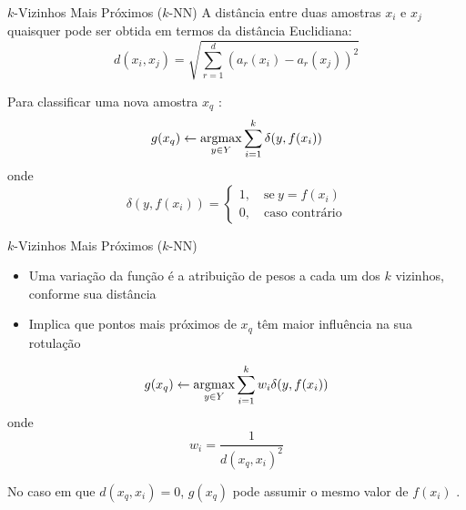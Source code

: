 \begin{frame}{$k$-Vizinhos Mais Próximos ($k$-NN)}
A distância entre duas amostras $x_i$ e $x_j$ quaisquer pode ser obtida em termos da distância Euclidiana:
\begin{equation*}
\label{eq:knn_distancia_euclidiana}
d(x_i, x_j) = \sqrt{\sum_{r=1}^d (a_r(x_i) - a_r(x_j))^2}
\end{equation*}

Para classificar uma nova amostra $x_q$ \citep{mitchell:97}:
\begin{equation*}
\label{eq:knn_funcao_argmax}
g(x_q) \gets \operatorname*{argmax}_{y \in Y} \sum_{i=1}^k \delta (y, f(x_i))
\end{equation*}
\noindent onde
\begin{equation*}
\label{eq:knn_delta}
  \delta (y, f(x_i)) =  \begin{cases}
                1, \quad \text{se}\ y = f(x_i) \\
                0, \quad \text{caso contrário}
              \end{cases}
\end{equation*}
\end{frame}

\begin{frame}{$k$-Vizinhos Mais Próximos ($k$-NN)}
\begin{itemize}
    \item Uma variação da função é a atribuição de pesos a cada um dos $k$ vizinhos, conforme sua distância
    \item Implica que pontos mais próximos de $x_q$ têm maior influência na sua rotulação
\end{itemize}
\begin{equation*}
g(x_q) \gets \operatorname*{argmax}_{y \in Y} \sum_{i=1}^k w_i \delta (y, f(x_i))
\end{equation*}
\noindent onde
\begin{equation*}
  w_i = \frac{1}{d(x_q, x_i)^2}
\end{equation*}

No caso em que $d(x_q, x_i) = 0$, $g(x_q)$ pode assumir o mesmo valor de $f(x_i)$ \citep{mitchell:97}.
\end{frame}

